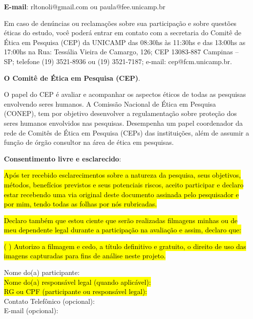 \documentclass[a4paper, 12pt]{article}
\begin{document}
\textbf{E-mail}: rltonoli@gmail.com ou paula@fee.unicamp.br

Em caso de denúncias ou reclamações sobre sua participação e sobre questões éticas do estudo,
você poderá entrar em contato com a secretaria do Comitê de Ética em Pesquisa (CEP) da UNICAMP das 08:30hs às 11:30hs e das 13:00hs as 17:00hs na Rua: Tessália Vieira de Camargo, 126; CEP 13083-887 Campinas – SP; telefone (19) 3521-8936 ou (19) 3521-7187; e-mail: cep@fcm.unicamp.br.

\vspace{10pt}
\textbf{O Comitê de Ética em Pesquisa (CEP)}.

O papel do CEP é avaliar e acompanhar os aspectos éticos de todas as pesquisas envolvendo seres humanos. A Comissão Nacional de Ética em Pesquisa (CONEP), tem por objetivo desenvolver a regulamentação sobre proteção dos seres humanos
envolvidos nas pesquisas. Desempenha um papel coordenador da rede de Comitês de
Ética em Pesquisa (CEPs) das instituições, além de assumir a função de órgão
consultor na área de ética em pesquisas.
\vspace{10pt}

\textbf{Consentimento livre e esclarecido}:

\hl{Após ter recebido esclarecimentos sobre a natureza da pesquisa, seus objetivos, métodos, benefícios
previstos e seus potenciais riscos, aceito participar e declaro estar
recebendo uma via original deste documento assinada pelo pesquisador e por mim, tendo todas as folhas
por nós rubricadas.}

\hl{Declaro também que estou ciente que serão realizadas filmagens minhas ou de meu dependente legal durante a participação na avaliação e assim, declaro que:}


\hl{(   ) Autorizo a filmagem e cedo, a título definitivo e gratuito, o direito de uso das imagens capturadas para fins de análise neste projeto.}

\vspace{5pt}
\noindent Nome do(a) participante:\hrulefill\\
\noindent \hl{Nome do(a) responsável legal (quando aplicável):}\hrulefill\\
\noindent \hl{RG ou CPF (participante ou responsável legal):}\hrulefill\\
\noindent Contato Telefônico (opcional):\hrulefill\\
E-mail (opcional):\hrulefill\\
\vspace{5pt}
\end{document}
